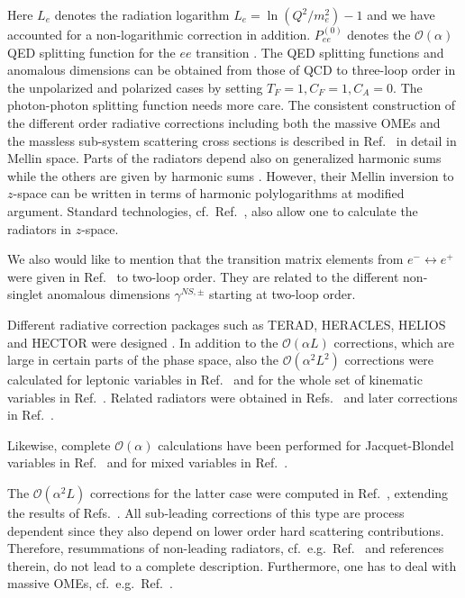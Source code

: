 Here $L_e$ denotes the radiation logarithm $L_e = \ln(Q^2/m_e^2) - 1$ and we have accounted for 
a non-logarithmic correction in addition. $P_{ee}^{(0)}$ denotes the $\mathcal{O}(\alpha)$ QED splitting 
function for the $e e$ transition \cite{Fermi:1924tc}. The QED splitting functions and anomalous 
dimensions can be obtained from those of QCD \cite{Moch:2004pa,Blumlein:2021enk,
Vogt:2004mw,Ablinger:2017tan,Moch:2014sna,Blumlein:2021ryt} to three-loop order in the unpolarized and polarized cases by 
setting $T_F = 1, C_F = 1, C_A = 0$. The photon-photon splitting function needs more care.
The consistent construction of the different order radiative corrections including both the massive OMEs and the 
massless sub-system scattering cross sections is described in Ref.~\cite{Ablinger:2020qvo} 
in detail in Mellin space. Parts of the radiators depend also on generalized harmonic sums
\cite{Moch:2001zr,Ablinger:2013cf} while the others are given by harmonic sums 
\cite{Vermaseren:1998uu,Blumlein:1998if}.
However, their Mellin inversion to $z$-space can be written in terms of harmonic 
polylogarithms \cite{Remiddi:1999ew} at modified argument. Standard technologies, cf.~Ref.~\cite{Blumlein:2018cms}, 
also allow one to 
calculate the radiators in $z$-space.

We also would like to mention that the
transition matrix elements from $e^- \leftrightarrow e^+$ were given in Ref.~\cite{Blumlein:2011mi} to two-loop order. They 
are 
related to the different non-singlet anomalous dimensions $\gamma^{NS,\pm}$ \cite{Moch:2014sna,Blumlein:2021enk} 
starting at two-loop order.

Different radiative correction packages such as {\sc TERAD, HERACLES, HELIOS} and 
{\sc HECTOR} were designed  \cite{Bardin:1980ii,Kwiatkowski:1990es,Blumlein:1991ag,Akhundov:1994my,Arbuzov:1995id}. 
In addition 
to the $\mathcal{O}(\alpha L)$ corrections, which are large in certain parts of the phase space, also the $\mathcal{O}(\alpha^2 L^2)$ 
corrections were calculated for leptonic variables in Ref.~\cite{Kripfganz:1990vm} and for the whole set of kinematic 
variables in Ref.~\cite{Blumlein:1994ii}. Related radiators were obtained in Refs.~\cite{Nicrosini:1986sm,Berends:1987ab}
and later corrections in Ref.~\cite{Blumlein:2011mi}.

Likewise, complete $\mathcal{O}(\alpha)$ 
calculations have been performed for 
Jacquet-Blondel variables in Ref.~\cite{Akhundov:1993wvk} and for mixed variables in Ref.~\cite{Bardin:1995mf}. 

The 
$\mathcal{O}(\alpha^2 L)$ corrections for the latter case were computed in Ref.~\cite{Blumlein:2002fy}, extending 
the results of Refs.~\cite{Bardin:1995mf,Blumlein:1994ii}. All sub-leading corrections of this type are process 
dependent since they also depend on lower order hard scattering contributions. Therefore, resummations of 
non-leading radiators, cf.~e.g.~Ref.~\cite{Bertone:2019hks} and references therein, do not lead to a complete 
description. Furthermore, one 
has to deal with massive OMEs, cf.~e.g.~Ref.~\cite{Blumlein:2011mi}.


